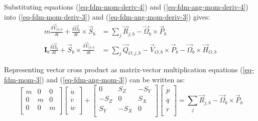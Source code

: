 Substituting equations (\ref{eq-fdm-mom-deriv-4}) and (\ref{eq-fdm-ang-mom-deriv-4}) into (\ref{eq-fdm-mom-deriv-3}) and (\ref{eq-fdm-ang-mom-deriv-3}) gives:
\begin{align}
  \label{eq-fdm-mom-3}
  m \frac{\delta {\vec V}_{O,b}}{\delta t}
  +
  \frac{\delta {\vec \Omega}_b}{\delta t} \times {\vec S}_b
  &=
  \sum_{j} {\vec R}_{j,b}
  -
  {\vec \Omega}_b \times {\vec P}_b \\
  \label{eq-fdm-ang-mom-3}
  {\boldsymbol I}_b \frac{\delta {\vec \Omega}_b}{\delta t}
  +
  {\vec S}_b \times \frac{\delta {\vec V}_{O,b}}{\delta t}
  &=
  \sum_{j} {\vec Q}_{O,j,b}
  -
  {\vec V}_{O,b} \times {\vec P}_b
  -
  {\vec \Omega}_b \times {\vec H}_{O,b}
\end{align}

Representing vector cross product as matrix-vector multiplication equations (\ref{eq-fdm-mom-3}) and (\ref{eq-fdm-ang-mom-3}) can be written as:
\begin{equation}
  \label{eq-fdm-mom-4}
  \left[
    \begin{matrix}
      m & 0 & 0 \\
      0 & m & 0 \\
      0 & 0 & m \\
    \end{matrix}
  \right]
  \left[
    \begin{matrix}
      \dot u \\
      \dot v \\
      \dot w \\
    \end{matrix}
  \right]
  +
  \left[
    \begin{matrix}
         0 &  S_Z & -S_Y \\
      -S_Z &    0 &  S_X \\
       S_Y & -S_X &    0 \\
    \end{matrix}
  \right]
  \left[
    \begin{matrix}
      \dot p \\
      \dot q \\
      \dot r \\
    \end{matrix}
  \right]
  =
  \sum_{j} {\vec R}_{j,b} - {\vec \Omega}_b \times {\vec P}_b
\end{equation}

